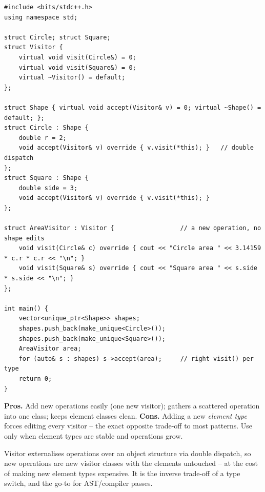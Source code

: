 \begin{lstlisting}
#include <bits/stdc++.h>
using namespace std;

struct Circle; struct Square;
struct Visitor {
    virtual void visit(Circle&) = 0;
    virtual void visit(Square&) = 0;
    virtual ~Visitor() = default;
};

struct Shape { virtual void accept(Visitor& v) = 0; virtual ~Shape() = default; };
struct Circle : Shape {
    double r = 2;
    void accept(Visitor& v) override { v.visit(*this); }   // double dispatch
};
struct Square : Shape {
    double side = 3;
    void accept(Visitor& v) override { v.visit(*this); }
};

struct AreaVisitor : Visitor {                  // a new operation, no shape edits
    void visit(Circle& c) override { cout << "Circle area " << 3.14159 * c.r * c.r << "\n"; }
    void visit(Square& s) override { cout << "Square area " << s.side * s.side << "\n"; }
};

int main() {
    vector<unique_ptr<Shape>> shapes;
    shapes.push_back(make_unique<Circle>());
    shapes.push_back(make_unique<Square>());
    AreaVisitor area;
    for (auto& s : shapes) s->accept(area);     // right visit() per type
    return 0;
}
\end{lstlisting}

\begin{complexitybox}
\textbf{Pros.} Add new operations easily (one new visitor); gathers a
scattered operation into one class; keeps element classes clean.
\textbf{Cons.} Adding a new \emph{element type} forces editing every
visitor -- the exact opposite trade-off to most patterns. Use only when
element types are stable and operations grow.
\end{complexitybox}

\begin{takeawaybox}
Visitor externalises operations over an object structure via double
dispatch, so new operations are new visitor classes with the elements
untouched -- at the cost of making new element types expensive. It is the
inverse trade-off of a type switch, and the go-to for AST/compiler passes.
\end{takeawaybox}
